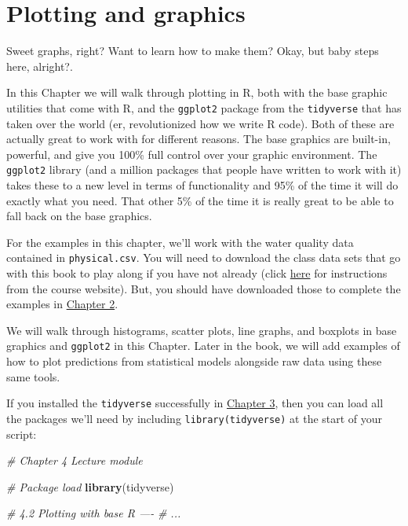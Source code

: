 \documentclass[
]{book}
\newenvironment{Shaded}{\begin{snugshade}}{\end{snugshade}}
\newcommand{\CommentTok}[1]{\textcolor[rgb]{0.56,0.35,0.01}{\textit{#1}}}
\newcommand{\KeywordTok}[1]{\textcolor[rgb]{0.13,0.29,0.53}{\textbf{#1}}}
\newcommand{\NormalTok}[1]{#1}
\begin{document}
\hypertarget{Chapter4}{%
\chapter{Plotting and graphics}\label{Chapter4}}

Sweet graphs, right? Want to learn how to make them? Okay, but baby steps here, alright?.

In this Chapter we will walk through plotting in R, both with the base graphic utilities that come with R, and the \texttt{ggplot2} package from the \texttt{tidyverse} that has taken over the world (er, revolutionized how we write R code). Both of these are actually great to work with for different reasons. The base graphics are built-in, powerful, and give you 100\% full control over your graphic environment. The \texttt{ggplot2} library (and a million packages that people have written to work with it) takes these to a new level in terms of functionality and 95\% of the time it will do exactly what you need. That other 5\% of the time it is really great to be able to fall back on the base graphics.

For the examples in this chapter, we'll work with the water quality data contained in \texttt{physical.csv}. You will need to download the class data sets that go with this book to play along if you have not already (click \href{https://danstich.github.io/stich/classes/BIOL217/software.html}{here} for instructions from the course website). But, you should have downloaded those to complete the examples in \protect\hyperlink{Chapter2}{Chapter 2}.

We will walk through histograms, scatter plots, line graphs, and boxplots in base graphics and \texttt{ggplot2} in this Chapter. Later in the book, we will add examples of how to plot predictions from statistical models alongside raw data using these same tools.

If you installed the \texttt{tidyverse} successfully in \protect\hyperlink{tidyverse}{Chapter 3}, then you can load all the packages we'll need by including \texttt{library(tidyverse)} at the start of your script:

\begin{Shaded}
\begin{Highlighting}[]
\CommentTok{# Chapter 4 Lecture module}

\CommentTok{# Package load}
\KeywordTok{library}\NormalTok{(tidyverse) }

\CommentTok{# 4.2 Plotting with base R ----}
\CommentTok{# ...}
\end{Highlighting}
\end{Shaded}
\end{document}
